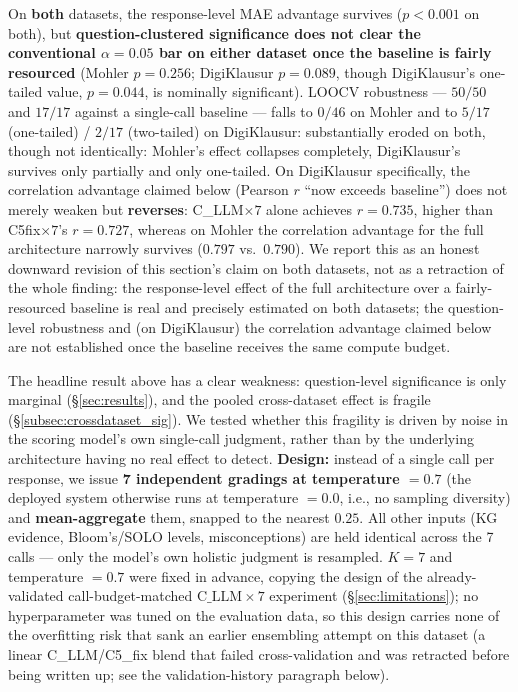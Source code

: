 \documentclass[conference]{IEEEtran}
\begin{document}
On \textbf{both} datasets, the response-level MAE advantage survives
($p<0.001$ on both), but \textbf{question-clustered significance does
not clear the conventional $\alpha=0.05$ bar on either dataset once the
baseline is fairly resourced} (Mohler $p=0.256$; DigiKlausur $p=0.089$,
though DigiKlausur's one-tailed value, $p=0.044$, is nominally
significant). LOOCV robustness --- $50/50$ and $17/17$ against a
single-call baseline --- falls to $0/46$ on Mohler and to $5/17$
(one-tailed) / $2/17$ (two-tailed) on DigiKlausur: substantially eroded
on both, though not identically: Mohler's effect collapses completely,
DigiKlausur's survives only partially and only one-tailed. On
DigiKlausur specifically, the correlation advantage claimed below
(Pearson $r$ ``now exceeds baseline'') does not merely weaken but
\textbf{reverses}: C\_LLM$\times7$ alone achieves $r=0.735$, higher than
C5fix$\times7$'s $r=0.727$, whereas on Mohler the correlation advantage
for the full architecture narrowly survives ($0.797$ vs.\ $0.790$). We
report this as an honest downward revision of this section's claim on
both datasets, not as a retraction of the whole finding: the
response-level effect of the full architecture over a fairly-resourced
baseline is real and precisely estimated on both datasets; the
question-level robustness and (on DigiKlausur) the correlation
advantage claimed below are not established once the baseline receives
the same compute budget.

The headline result above has a clear weakness: question-level
significance is only marginal (\S\ref{sec:results}), and the pooled
cross-dataset effect is fragile (\S\ref{subsec:crossdataset_sig}). We
tested whether this fragility is driven by noise in the scoring model's
own single-call judgment, rather than by the underlying architecture
having no real effect to detect. \textbf{Design:} instead of a single
call per response, we issue \textbf{7 independent gradings at
temperature $=0.7$} (the deployed system otherwise runs at temperature
$=0.0$, i.e., no sampling diversity) and \textbf{mean-aggregate} them,
snapped to the nearest $0.25$. All other inputs (KG evidence, Bloom's/SOLO
levels, misconceptions) are held identical across the 7 calls --- only
the model's own holistic judgment is resampled. $K=7$ and
temperature $=0.7$ were fixed in advance, copying the design of the
already-validated call-budget-matched $\text{C\_LLM}\times7$ experiment
(\S\ref{sec:limitations}); no hyperparameter was tuned on the evaluation
data, so this design carries none of the overfitting risk that sank an
earlier ensembling attempt on this dataset (a linear C\_LLM/C5\_fix
blend that failed cross-validation and was retracted before being
written up; see the validation-history paragraph below).
\end{document}
